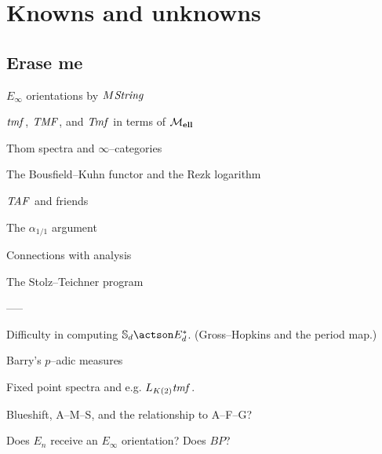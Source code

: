 
\chapter{Knowns and unknowns}

\section{Erase me}


$E_\infty$ orientations by $M\mathit{String}$

$\mathit{tmf}$, $\mathit{TMF}$, and $\mathit{Tmf}$ in terms of $\mathcal{M}_{\mathbf{ell}}$

Thom spectra and $\infty$--categories

The Bousfield--Kuhn functor and the Rezk logarithm



$\mathit{TAF}$ and friends

The $\alpha_{1/1}$ argument




Connections with analysis

The Stolz--Teichner program






-----

Difficulty in computing $\S_d \actson E_d^*$. (Gross--Hopkins and the period map.)

Barry's $p$--adic measures

Fixed point spectra and e.g. $L_{K(2)} \mathit{tmf}$.

Blueshift, A--M--S, and the relationship to A--F--G?

Does $E_n$ receive an $E_\infty$ orientation?  Does $BP$?

